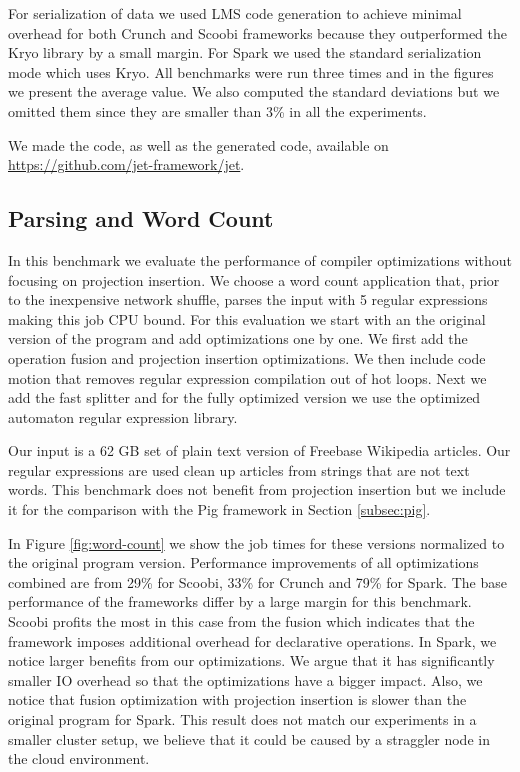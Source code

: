 For serialization of data we used LMS code generation to achieve minimal
overhead for both Crunch and Scoobi frameworks because they outperformed the
Kryo \cite{ kryo} library by a small margin. For Spark we used the standard
serialization mode which uses Kryo. All benchmarks were run three times and in
the figures we present the average value. We also computed the standard
deviations but we omitted them since they are smaller than 3\% in all the
experiments.

We made the \tool code, as well as the generated code, available on
\url{https://github.com/jet-framework/jet}.


\subsection{Parsing and Word Count}
\label{subsec:parsing-word-count}

In this benchmark we evaluate the performance of \tool compiler optimizations
without focusing on projection insertion. We choose a word count application
that, prior to the inexpensive network shuffle, parses the input with 5 regular
expressions making this job CPU bound. For this evaluation we start with an the
original version of the program and add optimizations one by one. We first add
the operation fusion and projection insertion optimizations. We then include
code motion that removes regular expression compilation out of hot loops. Next
we add the fast splitter and for the fully optimized version we use the
optimized automaton regular expression library.

Our input is a 62 GB set of plain text version of Freebase Wikipedia articles.
Our regular expressions are used clean up articles from strings that are not
text words. This benchmark does not benefit from projection insertion but we
include it for the comparison with the Pig framework in Section
\ref{subsec:pig}.

In Figure \ref{fig:word-count} we show the job times for these versions
normalized to the original program version. Performance improvements of all
optimizations combined are from 29\% for Scoobi, 33\% for Crunch and 79\% for
Spark. The base performance of the frameworks differ by a large margin for this
benchmark. Scoobi profits the most in this case from the fusion which indicates
that the framework imposes additional overhead for declarative operations. In
Spark, we notice larger benefits from our optimizations. We argue that it has
significantly smaller IO overhead so that the optimizations have a bigger
impact. Also, we notice that fusion optimization with projection insertion is
slower than the original program for Spark. This result does not match our
experiments in a smaller cluster setup, we believe that it could be caused by a
straggler node in the cloud environment.

